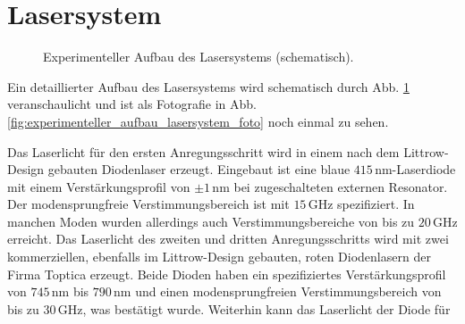 \section{Lasersystem}\label{sec:lasersystem}
\begin{figure}[h]
 	\centering
	\caption[Experimenteller Aufbau des Lasersystems, schematisch]{Experimenteller
	Aufbau des Lasersystems
	(schematisch).}\label{fig:experimenteller_aufbau_lasersystem}
\end{figure}
Ein detaillierter Aufbau des Lasersystems wird schematisch durch Abb.
\ref{fig:experimenteller_aufbau_lasersystem} veranschaulicht und ist als
Fotografie in Abb. \ref{fig:experimenteller_aufbau_lasersystem_foto} noch einmal
zu sehen.\par
Das Laserlicht für den ersten Anregungsschritt wird in einem nach dem
Littrow-Design gebauten Diodenlaser erzeugt. Eingebaut ist eine blaue
$415\,$nm-Laserdiode mit einem Verstärkungsprofil von $\pm1\,$nm bei
zugeschalteten externen Resonator. Der modensprungfreie Verstimmungsbereich ist
mit $15\,$GHz spezifiziert. In manchen Moden wurden allerdings auch Verstimmungsbereiche
von bis zu $20\,$GHz erreicht. Das Laserlicht des zweiten und dritten
Anregungsschritts wird mit zwei kommerziellen, ebenfalls im Littrow-Design
gebauten, roten Diodenlasern der Firma Toptica erzeugt.
Beide Dioden haben ein spezifiziertes Verstärkungsprofil von
$745\,$nm bis $790\,$nm und einen modensprungfreien Verstimmungsbereich von bis
zu $30\,$GHz, was bestätigt wurde. Weiterhin kann das Laserlicht der Diode für
